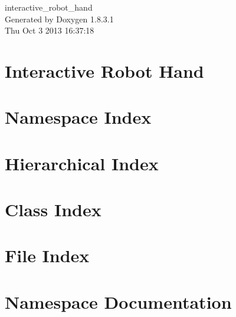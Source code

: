\documentclass{book}
\begin{document}
\begin{titlepage}
\vspace*{7cm}
\begin{center}
{\Large interactive\-\_\-robot\-\_\-hand }\\
\vspace*{1cm}
{\large Generated by Doxygen 1.8.3.1}\\
\vspace*{0.5cm}
{\small Thu Oct 3 2013 16:37:18}\\
\end{center}
\end{titlepage}
\clearemptydoublepage
{}
\tableofcontents
\clearemptydoublepage
{}
\chapter{Interactive Robot Hand}
\label{index}
\chapter{Namespace Index}

\chapter{Hierarchical Index}

\chapter{Class Index}

\chapter{File Index}

\chapter{Namespace Documentation}







\end{document}
